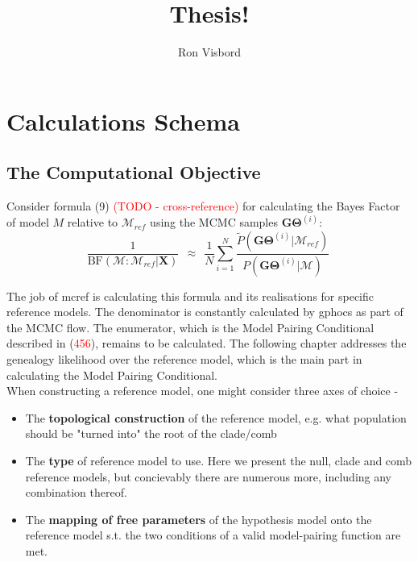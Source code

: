 \documentclass[11pt]{article}
\author{Ron Visbord}
\title{Thesis!}
\newcommand{\vect}[1]{\boldsymbol{\mathbf{#1}}}
\newcommand{\X}{\vect{X}}
\newcommand{\M}{\mathcal{M}}
\newcommand{\G}{\vect{G}}
\newcommand{\T}{\vect{\Theta}}
\newcommand{\GT}{\G\T}
\newcommand{\Mref}{\M_{ref}}
\newcommand{\Pref}{\widetilde{P}}
\newcommand{\rbf}{\text{BF}}
\newcommand{\1}{\mathbbm{1}}
\begin{document}
\maketitle


\section{Calculations Schema}


\subsection{The Computational Objective}

Consider formula (9) \textcolor{red}{(TODO - cross-reference)} for calculating the Bayes Factor of model $M$ relative to $\Mref$ using the MCMC samples $\GT^{(i)}$:
%
%
\begin{equation}\label{eq:rbf}
 \frac{1}{\rbf(\M:\Mref|\X)}  ~~\approx~~ \frac{1}{N} \sum_{i=1}^{N}\frac{\Pref(\GT^{(i)}|\Mref) }{P(\GT^{(i)}|\M)} ~ 
\end{equation}

The job of mcref is calculating this formula and its realisations for specific reference models. 
The denominator is constantly calculated by gphocs as part of the MCMC flow. The enumerator, which is the Model Pairing Conditional described in (\textcolor{red}{456}), remains to be calculated. The following chapter addresses the genealogy likelihood over the reference model, which is the main part in calculating the Model Pairing Conditional.\\

When constructing a reference model, one might consider three axes of choice - 
\begin{itemize}
\item The \textbf{topological construction} of the reference model, e.g. what population should be "turned into" the root of the clade/comb

\item The \textbf{type} of reference model to use. Here we present the null, clade and comb reference models, but concievably there are numerous more, including any combination thereof.

\item The \textbf{mapping of free parameters} of the hypothesis model onto the reference model s.t. the two conditions of a valid model-pairing function are met.
\end{itemize}
\end{document}
